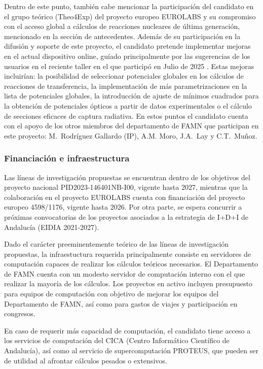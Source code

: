 \documentclass[a4paper,12pt,twoside]{article}
\begin{document}
Dentro de este punto, también cabe mencionar la participación del candidato en el grupo teórico (Theo4Exp) del proyecto europeo EUROLABS \cite{eurolabs} y su compromiso con el acceso global a cálculos de reacciones nucleares de última generación, mencionado en la sección de antecedentes. Además de su participación en la difusión y soporte de este proyecto, el candidato pretende implementar mejoras en el actual dispositivo online, guíado principalmente por las sugerencias de los usuarios en el reciente taller en el que participó en Julio de 2025 \cite{Workshop_Trento_25}. Estas mejoras incluirían: la posibilidad de seleccionar potenciales globales en los cálculos de reacciones de transferencia, la implementación de más parametrizaciones en la lista de potenciales globales, la introducción de ajuste de mínimos cuadrados para la obtención de potenciales ópticos a partir de datos experimentales o el cálculo de secciones eficaces de captura radiativa. En estos puntos el candidato cuenta con el apoyo de los otros miembros del departamento de FAMN que participan en este proyecto: M.~Rodríguez Gallardo (IP), A.M. Moro, J.A.~Lay y C.T.~Muñoz.

\subsubsection{Financiación e infraestructura}

Las líneas de investigación propuestas se encuentran dentro de los objetivos del proyecto nacional PID2023-146401NB-I00, vigente hasta 2027, mientras que la colaboración en el proyecto EUROLABS cuenta con financiación del proyecto europeo 4598/1176, vigente hasta 2026. Por otra parte, se espera concurrir a próximas convocatorias de los proyectos asociados a la estrategia de I+D+I de Andalucía (EIDIA 2021-2027).

Dado el carácter preeminentemente teórico de las líneas de investigación propuestas, la infraestuctura requerida principalmente consiste en servidores de computación capaces de realizar los cálculos teóricos necesarios. El Departamento de FAMN cuenta con un modesto servidor de computación interno con el que realizar la mayoría de los cálculos. Los proyectos en activo incluyen presupuesto para equipos de computación con objetivo de mejorar los equipos del Departamento de FAMN, así como para gastos de viajes y participación en congresos. 

En caso de requerir más capacidad de computación, el candidato tiene acceso a los servicios de computación del CICA (Centro Informático
Científico de Andalucía), así como al servicio de supercomputación PROTEUS, que pueden ser de utilidad al afrontar cálculos pesados o extensivos.

%


\end{document}

